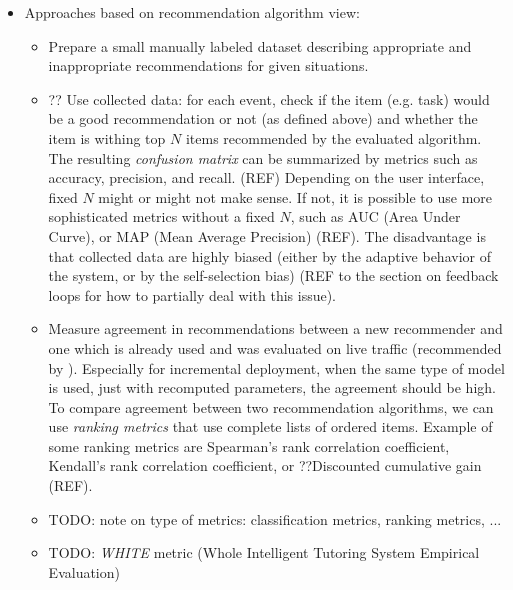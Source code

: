 \begin{itemize}
\item Approaches based on recommendation algorithm view:
\begin{itemize}
\item Prepare a small manually labeled dataset describing appropriate and
  inappropriate recommendations for given situations.
\item ?? Use collected data: for each event, check if the item (e.g. task)
  would be a good recommendation or not (as defined above)
  and whether the item is withing top $N$ items recommended by the evaluated
  algorithm. The resulting \emph{confusion matrix} can be summarized
  by metrics such as accuracy, precision, and recall. (REF)
  Depending on the user interface, fixed $N$ might or might not make sense.
  If not, it is possible to use more sophisticated metrics without a fixed $N$,
  such as AUC (Area Under Curve), or MAP (Mean Average Precision) (REF).
  The disadvantage is that collected data are highly biased (either by the
  adaptive behavior of the system, or by the self-selection bias)
  (REF to the section on feedback loops for how to partially deal with this issue).
\item Measure agreement in recommendations between a new recommender and one
  which is already used and was evaluated on live traffic (recommended by
  \cite[][Rule \#24]{google-ml-rules}). Especially for incremental deployment,
  when the same type of model is used, just with recomputed parameters,
  the agreement should be high.
  To compare agreement between two recommendation algorithms, we can use
  \emph{ranking metrics} that use complete lists of ordered items.
  Example of some ranking metrics are Spearman's rank correlation coefficient,
  Kendall's rank correlation coefficient, or ??Discounted cumulative gain (REF).
\item TODO: note on type of metrics: classification metrics, ranking metrics, ...
\item TODO: \emph{WHITE} metric (Whole Intelligent Tutoring System Empirical Evaluation)
  \cite{evaluation-leopard}
\end{itemize}


\end{itemize}

